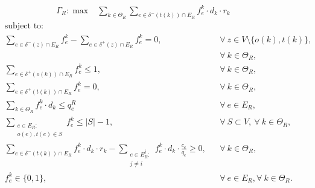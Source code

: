 \documentclass{article}
\begin{document}
\begin{appendices}
  \begin{align}
        &  \Gamma_R: \max  & \sum_{k \in \Theta_R} \sum_{e \in \delta^-(t(k))\cap E_R}  f_e^k \cdot d_k \cdot r_k &&   
    \end{align}
    \begin{align}
        & \text{subject to:}       && \nonumber\\
        & \sum_{e \in \delta^-(z)\cap E_R} f_e^k-\sum_{e \in \delta^+(z)\cap E_R} f_{e}^k  = 0,           \quad && \forall\ z\in V\setminus\{o(k),t(k)\},\nonumber\\
        & && \forall\ k\in\Theta_R, \\[1em]
& \sum_{e \in \delta^+(o(k))\cap E_R} f_e^k\leq 1, && \forall\ k\in \Theta_R,  \\
& \sum_{e \in \delta^+(t(k))\cap E_R} f_e^k  = 0, && \forall\ k\in \Theta_R,  \\
 & \sum_{k \in \Theta_R} f_e^k\cdot d_k \leq q_e^R   &&\forall\ e \in E_R,   \\
& \sum_{\substack{e\in E_R\colon\\o(e),t(e)\in S }} f_e^k \leq |S| -1,  && \forall\ S \subset V, \ \forall\ k \in \Theta_R, \\
& \sum_{e \in \delta^-(t(k))\cap E_R}  f_e^k  \cdot d_k \cdot r_k -\sum_{\substack{e \in E_R^j\colon \\ j\not = i}} f_e^k \cdot d_k \cdot \frac{c_e}{q_e}\geq 0, && \forall\ k \in \Theta_R, \\
& f_e^k \in \{0,1\},    && \forall\ e \in E_R, \forall\ k \in \Theta_R.
    \end{align}

\end{appendices}
\end{document}
